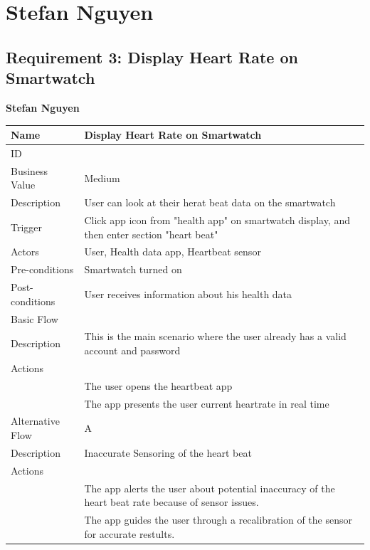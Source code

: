 \documentclass{article}
\begin{document}
\section{Stefan Nguyen}

\subsection{Requirement 3: Display Heart Rate on Smartwatch}
	\textbf{Stefan Nguyen}
	\begin{center}
		\begin{tabularx}{1.0\textwidth}{|>{\raggedright\arraybackslash}p{}|>{\raggedright\arraybackslash}X|}
			\hline
			Name             & Display Heart Rate on Smartwatch \\ \hline
			ID               & 3 \\ \hline
			Business Value   & Medium \\ \hline
			Description      & User can look at their herat beat data on the smartwatch \\ \hline
			Trigger          & Click app icon from "health app" on smartwatch display, and then enter section "heart beat" \\ \hline
			Actors           & User, Health data app, Heartbeat sensor \\ \hline
			Pre-conditions   & Smartwatch turned on \\ \hline
			Post-conditions  & User receives information about his health data \\ \hline
			Basic Flow       & \\ \hline
							Description & This is the main scenario where the user already has a valid account and password \\ \hline
							Actions & \\ \hline
							1 & The user opens the heartbeat app \\ \hline
							2 & The app presents the user current heartrate in real time \\ \hline
			Alternative Flow & A \\ \hline
							Description & Inaccurate Sensoring of the heart beat \\ \hline
							Actions & \\ \hline
							1 & The app alerts the user about potential inaccuracy of the heart beat rate because of sensor issues. \\ \hline
							2 & The app guides the user through a recalibration of the sensor for accurate restults.  \\ \hline

\end{tabularx}
\end{center}
\end{document}
